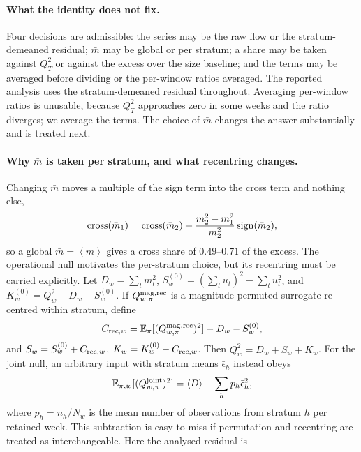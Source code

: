 \documentclass[aps,pre,onecolumn,superscriptaddress,floatfix,nofootinbib]{revtex4-2}
\newcommand{\avg}[1]{\left\langle #1 \right\rangle}
\begin{document}
\paragraph*{What the identity does not fix.}
Four decisions are admissible: the series may be the raw flow or the
stratum-demeaned residual; $\bar m$ may be global or per stratum; a share may
be taken against $Q_T^2$ or against the excess over the size baseline; and the
terms may be averaged before dividing or the per-window ratios averaged. The
reported analysis uses the stratum-demeaned residual throughout. Averaging
per-window ratios is unusable, because $Q_T^2$ approaches zero in some weeks and the ratio
diverges; we average the terms. The choice of $\bar m$ changes the answer
substantially and is treated next.

\paragraph*{Why $\bar m$ is taken per stratum, and what recentring changes.}
Changing $\bar m$ moves a multiple of the sign term into the cross term and
nothing else,
\begin{equation}
  {\rm cross}(\bar m_1)={\rm cross}(\bar m_2)
   +\frac{\bar m_2^{2}-\bar m_1^{2}}{\bar m_2^{2}}\,{\rm sign}(\bar m_2) ,
  \label{eq:supp-mbarshift}
\end{equation}
so a global $\bar m=\avg{m}$ gives a cross share of $0.49$--$0.71$ of the
excess. The operational null motivates the per-stratum choice, but its
recentring must be carried explicitly. Let
$D_w=\sum_t m_t^2$, $S_w^{(0)}=(\sum_t u_t)^2-\sum_t u_t^2$, and
$K_w^{(0)}=Q_w^2-D_w-S_w^{(0)}$. If $Q_{w,\pi}^{\rm mag,rec}$ is a
magnitude-permuted surrogate re-centred within stratum, define
\begin{equation}
 C_{{\rm rec},w}=\mathbb E_\pi[(Q_{w,\pi}^{\rm mag,rec})^2]
                    -D_w-S_w^{(0)},
 \label{eq:supp-reccorrection}
\end{equation}
and $S_w=S_w^{(0)}+C_{{\rm rec},w}$,
$K_w=K_w^{(0)}-C_{{\rm rec},w}$. Then
$Q_w^2=D_w+S_w+K_w$. For the joint null, an arbitrary input with stratum
means $\bar\epsilon_h$ instead obeys
\begin{equation}
 \mathbb E_{\pi,w}[(Q_{w,\pi}^{\rm joint})^2]
 =\avg D-\sum_h p_h\bar\epsilon_h^2,
 \label{eq:supp-jointcorrection}
\end{equation}
where $p_h=n_h/N_w$ is the mean number of observations from stratum $h$ per
retained week. This subtraction is easy to miss if permutation and
recentring are treated as interchangeable. Here the analysed residual is
\end{document}
